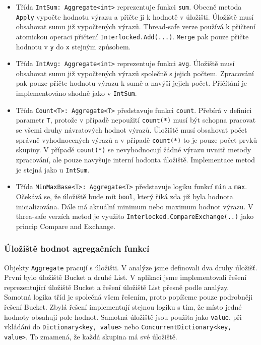 \begin{itemize}
\item Třída \texttt{IntSum: Aggregate<int>} reprezentuje funkci \texttt{sum}.
Obecně metoda \texttt{Apply} vypočte hodnotu výrazu a přičte ji k hodnotě v úložišti.
Úložiště musí obsahovat sumu již vypočtených výrazů.
Thread-safe verze používá k přičtení atomickou operaci přičtení \texttt{Interlocked.Add(...)}.
\texttt{Merge} pak pouze přičte hodnotu v \texttt{y} do \texttt{x} stejným způsobem.
\item Třída \texttt{IntAvg: Aggregate<int>} reprezentuje funkci \texttt{avg}.
Úložiště musí obsahovat sumu již vypočtených výrazů společně s jejich počtem.
Zpracování pak pouze přičte hodnotu výrazu k sumě a navýší jejich počet.
Přičítání je implementováno shodně jako v \texttt{IntSum}.
\item Třída \texttt{Count<T>: Aggregate<T>} představuje funkci \texttt{count}.
Přebírá v definici parametr \texttt{T}, protože v případě nepoužití \texttt{count(*)} musí být schopna pracovat se všemi druhy návratových hodnot výrazů.
Úložiště musí obsahovat počet správně vyhodnocených výrazů a v případě \texttt{count(*)} to je pouze počet prvků skupiny.
V případě \texttt{count(*)} se nevyhodnocují žádné výrazu uvnitř metody zpracování, ale pouze navyšuje interní hodonta úložiště.
Implementace metod je stejná jako u \texttt{IntSum}.

\item Třída \texttt{MinMaxBase<T>: Aggregate<T>} představuje logiku funkcí \texttt{min} a \texttt{max}.
Očekává se, že úložiště bude mít \texttt{bool}, který říká zda již byla hodnota inicializována.
Dále má aktuální minimum nebo maximum hodnot výrazu. 
V threa-safe verzích metod je využito \texttt{Interlocked.CompareExchange(..)} jako princip Compare and Exchange. 
\end{itemize}

\subsubsection{Úložiště hodnot agregačních funkcí}

Objekty \texttt{Aggregate} pracují s úložišti.
V analýze jsme definovali dva druhy úložišť.
První bylo úložiště Bucket a druhé List.
V aplikaci jsme implementovali řešení reprezentující úložiště Bucket a řešení úložiště List přesně podle analýzy.
Samotná logika tříd je společná všem řešením, proto popíšeme pouze podrobněji řešení Bucket.
Zbylá řešení implementují stejnou logiku s tím, že místo jedné hodnoty obsahují pole hodnot.
Samotná úložiště jsou použita jako \texttt{value}, při vkládání do \texttt{Dictionary<key, value>} nebo \texttt{ConcurrentDictionary<key, value>}.
To zmamená, že každá skupina má své úložiště.

